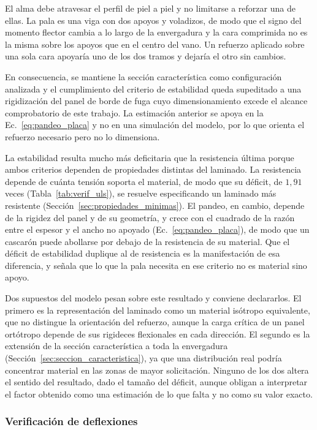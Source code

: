 El alma debe atravesar el perfil de piel a piel y no limitarse a reforzar una de ellas. La pala es una viga con dos apoyos y voladizos, de modo que el signo del momento flector cambia a lo largo de la envergadura y la cara comprimida no es la misma sobre los apoyos que en el centro del vano. Un refuerzo aplicado sobre una sola cara apoyaría uno de los dos tramos y dejaría el otro sin cambios.

En consecuencia, se mantiene la sección característica como configuración analizada y el cumplimiento del criterio de estabilidad queda supeditado a una rigidización del panel de borde de fuga cuyo dimensionamiento excede el alcance comprobatorio de este trabajo. La estimación anterior se apoya en la Ec.~\ref{eq:pandeo_placa} y no en una simulación del modelo, por lo que orienta el refuerzo necesario pero no lo dimensiona.

La estabilidad resulta mucho más deficitaria que la resistencia última porque ambos criterios dependen de propiedades distintas del laminado. La resistencia depende de cuánta tensión soporta el material, de modo que su déficit, de $1{,}91$ veces (Tabla~\ref{tab:verif_uls}), se resuelve especificando un laminado más resistente (Sección~\ref{sec:propiedades_minimas}). El pandeo, en cambio, depende de la rigidez del panel y de su geometría, y crece con el cuadrado de la razón entre el espesor y el ancho no apoyado (Ec.~\ref{eq:pandeo_placa}), de modo que un cascarón puede abollarse por debajo de la resistencia de su material. Que el déficit de estabilidad duplique al de resistencia es la manifestación de esa diferencia, y señala que lo que la pala necesita en ese criterio no es material sino apoyo.

Dos supuestos del modelo pesan sobre este resultado y conviene declararlos. El primero es la representación del laminado como un material isótropo equivalente, que no distingue la orientación del refuerzo, aunque la carga crítica de un panel ortótropo depende de sus rigideces flexionales en cada dirección. El segundo es la extensión de la sección característica a toda la envergadura (Sección~\ref{sec:seccion_caracteristica}), ya que una distribución real podría concentrar material en las zonas de mayor solicitación. Ninguno de los dos altera el sentido del resultado, dado el tamaño del déficit, aunque obligan a interpretar el factor obtenido como una estimación de lo que falta y no como su valor exacto.

\subsubsection{Verificación de deflexiones}

